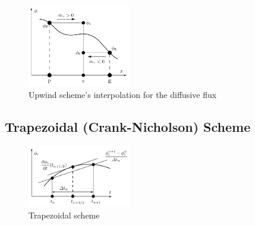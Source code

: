 \documentclass[twocolumn,10pt]{asme2ej}
\begin{document}
\begin{figure}[tbh]
\begin{center}
\includegraphics[width=0.4\textwidth]{figure/Upwind.png}
\caption{Upwind scheme's interpolation for the diffusive flux}
\label{Upwind_scheme}
\end{center}
\end{figure}

\subsection{Trapezoidal (Crank-Nicholson) Scheme}
\begin{figure}[thb]
\begin{center}
\includegraphics[width=0.4\textwidth]{figure/Trapezoidal (time derivative).png}
\caption{Trapezoidal scheme}
\label{Trapezoidal_scheme}
\end{center}
\end{figure}
\end{document}
